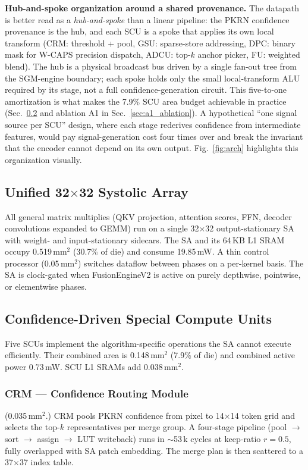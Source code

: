 \documentclass[journal]{IEEEtran}
\begin{document}
\textbf{Hub-and-spoke organization around a shared provenance.} The datapath is better read as a \emph{hub-and-spoke} than a linear pipeline: the PKRN confidence provenance is the hub, and each SCU is a spoke that applies its own local transform (CRM: threshold + pool, GSU: sparse-store addressing, DPC: binary mask for W-CAPS precision dispatch, ADCU: top-$k$ anchor picker, FU: weighted blend). The hub is a physical broadcast bus driven by a single fan-out tree from the SGM-engine boundary; each spoke holds only the small local-transform ALU required by its stage, not a full confidence-generation circuit. This five-to-one amortization is what makes the 7.9\% SCU area budget achievable in practice (Sec.~\ref{sec:scu} and ablation A1 in Sec.~\ref{sec:a1_ablation}). A hypothetical ``one signal source per SCU'' design, where each stage rederives confidence from intermediate features, would pay signal-generation cost four times over and break the invariant that the encoder cannot depend on its own output. Fig.~\ref{fig:arch} highlights this organization visually.

\subsection{Unified 32$\times$32 Systolic Array}
\label{sec:sa}
All general matrix multiplies (QKV projection, attention scores, FFN, decoder convolutions expanded to GEMM) run on a single 32$\times$32 output-stationary SA with weight- and input-stationary sidecars. The SA and its 64\,KB L1 SRAM occupy 0.519\,mm$^2$ (30.7\% of die) and consume 19.85\,mW. A thin control processor (0.05\,mm$^2$) switches dataflow between phases on a per-kernel basis. The SA is clock-gated when FusionEngineV2 is active on purely depthwise, pointwise, or elementwise phases.

\subsection{Confidence-Driven Special Compute Units}
\label{sec:scu}
Five SCUs implement the algorithm-specific operations the SA cannot execute efficiently. Their combined area is 0.148\,mm$^2$ (7.9\% of die) and combined active power 0.73\,mW. SCU L1 SRAMs add 0.038\,mm$^2$.

\subsubsection{CRM --- Confidence Routing Module}
(0.035\,mm$^2$.) CRM pools PKRN confidence from pixel to 14$\times$14 token grid and selects the top-$k$ representatives per merge group. A four-stage pipeline (pool $\to$ sort $\to$ assign $\to$ LUT writeback) runs in $\sim$53\,k cycles at keep-ratio $r{=}0.5$, fully overlapped with SA patch embedding. The merge plan is then scattered to a 37$\times$37 index table.
\end{document}
